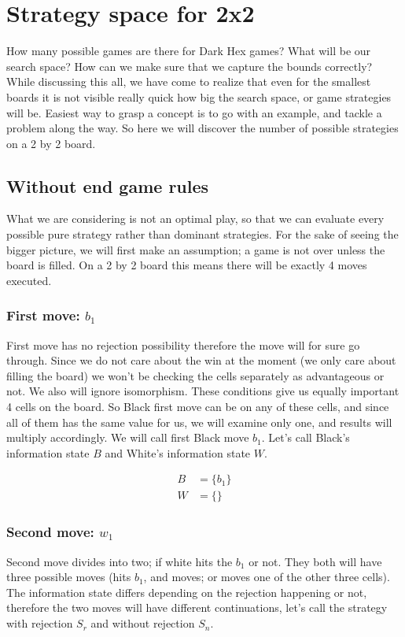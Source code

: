 \section{Strategy space for 2x2}

How many possible games are there for Dark Hex games? What will be our search space? How can we make sure that we capture the bounds correctly? While discussing this all, we have come to realize that even for the smallest boards it is not visible really quick how big the search space, or game strategies will be. Easiest way to grasp a concept is to go with an example, and tackle a problem along the way. So here we will discover the number of possible strategies on a 2 by 2 board.

\subsection{Without end game rules}
What we are considering is not an optimal play, so that we can evaluate every possible pure strategy rather than dominant strategies. For the sake of seeing the bigger picture, we will first make an assumption; a game is not over unless the board is filled. On a 2 by 2 board this means there will be exactly 4 moves executed.

\subsubsection*{First move: $b_1$}
First move has no rejection possibility therefore the move will for sure go through. Since we do not care about the win at the moment (we only care about filling the board) we won't be checking the cells separately as advantageous or not. We also will ignore isomorphism. These conditions give us equally important 4 cells on the board. So Black first move can be on any of these cells, and since all of them has the same value for us, we will examine only one, and results will multiply accordingly. We will call first Black move $b_1$. Let's call Black's information state $B$ and White's information state $W$.

\begin{align}
	B &= \{b_1\} \nonumber\\
	W &= \{\} \nonumber
\end{align}

\subsubsection*{Second move: $w_1$}
Second move divides into two; if white hits the $b_1$ or not. They both will have three possible moves (hits $b_1$, and moves; or moves one of the other three cells). The information state differs depending on the rejection happening or not, therefore the two moves will have different continuations, let's call the strategy with rejection $S_r$ and without rejection $S_n$. 


